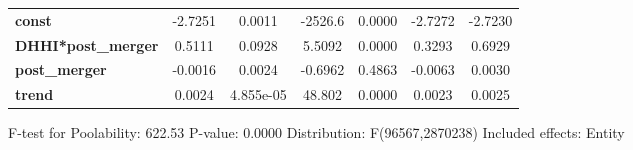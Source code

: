 \documentclass{report}
\begin{document}
\begin{center}
\begin{tabular}{lcccccc}
\midrule
\textbf{const}             &      -2.7251       &       0.0011       &     -2526.6     &      0.0000      &      -2.7272      &      -2.7230       \\
\textbf{DHHI*post\_merger} &       0.5111       &       0.0928       &      5.5092     &      0.0000      &       0.3293      &       0.6929       \\
\textbf{post\_merger}      &      -0.0016       &       0.0024       &     -0.6962     &      0.4863      &      -0.0063      &       0.0030       \\
\textbf{trend}             &       0.0024       &     4.855e-05      &      48.802     &      0.0000      &       0.0023      &       0.0025       \\
\bottomrule
\end{tabular}
\end{center}

F-test for Poolability: 622.53 \newline
 P-value: 0.0000 \newline
 Distribution: F(96567,2870238) \newline
  \newline
 Included effects: Entity
\end{document}
